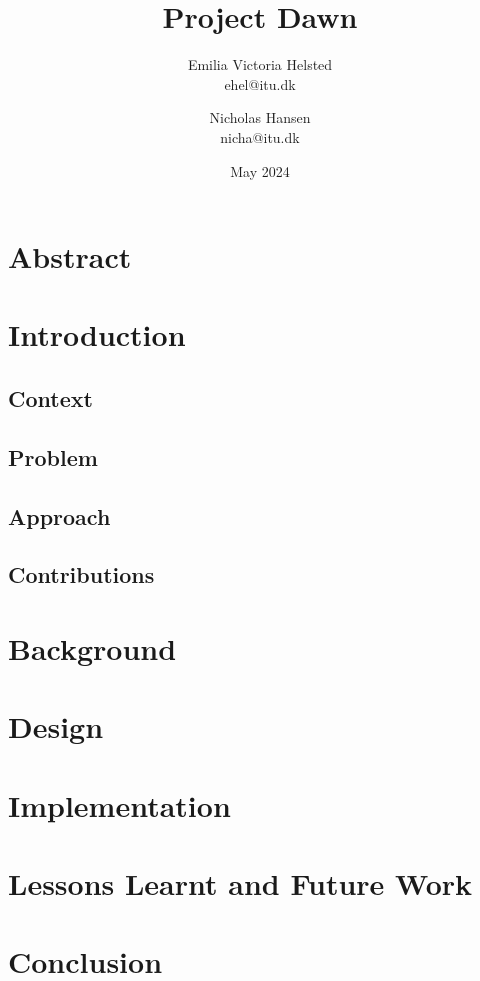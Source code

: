 \documentclass{article}
\title{Project Dawn}
\author{
    Emilia Victoria Helsted\\ ehel@itu.dk
   \and 
   Nicholas Hansen\\ nicha@itu.dk }
\date{May 2024}
\begin{document}
\maketitle
\newpage
\section*{Abstract}
\section{Introduction}
\subsection{Context}
\subsection{Problem}
\subsection{Approach}
\subsection{Contributions}
\section{Background}
\section{Design}    
\section{Implementation}    
\section{Lessons Learnt and Future Work}    
\section{Conclusion}


\clearpage

\printglossaries

\medskip

\printbibliography
\end{document}
